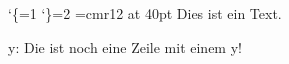 %
%
%
\catcode`\{=1 %
\catcode`\}=2 %
%
%
\font\hugo=cmr12  at 40pt
\hugo
Dies ist ein Text.


y: Die ist noch eine Zeile mit einem y!
